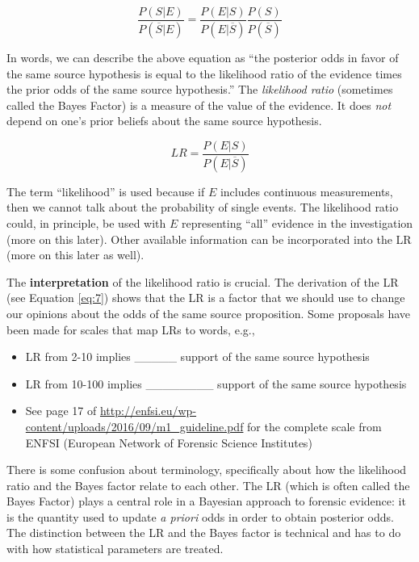 \documentclass[]{book}
\providecommand{\tightlist}{%
  \setlength{\itemsep}{0pt}\setlength{\parskip}{0pt}}
\theoremstyle{definition}
\theoremstyle{definition}
\theoremstyle{remark}
\begin{document}
\[\frac{P(S|E)}{P(\overline{S}|E)} = \frac{P(E|S)}{P(E|\overline{S})}\frac{P(S)}{P(\overline{S})}\]

In words, we can describe the above equation as ``the posterior odds in
favor of the same source hypothesis is equal to the likelihood ratio of
the evidence times the prior odds of the same source hypothesis.'' The
\emph{likelihood ratio} (sometimes called the Bayes Factor) is a measure
of the value of the evidence. It does \emph{not} depend on one's prior
beliefs about the same source hypothesis.

\begin{equation}\label{eq:lr}
LR = \frac{P(E|S)}{P(E|\overline{S})}
\end{equation}

The term ``likelihood'' is used because if \(E\) includes continuous
measurements, then we cannot talk about the probability of single
events. The likelihood ratio could, in principle, be used with \(E\)
representing ``all'' evidence in the investigation (more on this later).
Other available information can be incorporated into the LR (more on
this later as well).

The \textbf{interpretation} of the likelihood ratio is crucial. The
derivation of the LR (see Equation \ref{eq:7}) shows that the LR is a
factor that we should use to change our opinions about the odds of the
same source proposition. Some proposals have been made for scales that
map LRs to words, e.g.,

\begin{itemize}
\tightlist
\item
  LR from 2-10 implies \_\_\_\_\_ support of the same source
  hypothesis\vspace{.1in}
\item
  LR from 10-100 implies \_\_\_\_\_\_\_\_ support of the same source
  hypothesis\vspace{.1in}
\item
  See page 17 of
  \url{http://enfsi.eu/wp-content/uploads/2016/09/m1_guideline.pdf} for
  the complete scale from ENFSI (European Network of Forensic Science
  Institutes)
\end{itemize}

There is some confusion about terminology, specifically about how the
likelihood ratio and the Bayes factor relate to each other. The LR
(which is often called the Bayes Factor) plays a central role in a
Bayesian approach to forensic evidence: it is the quantity used to
update \emph{a priori} odds in order to obtain posterior odds. The
distinction between the LR and the Bayes factor is technical and has to
do with how statistical parameters are treated.
\end{document}
